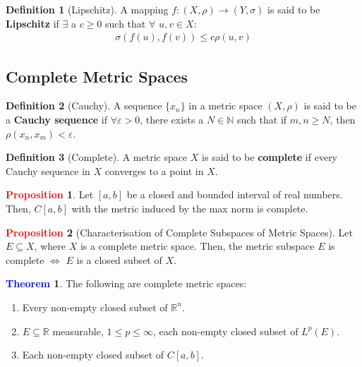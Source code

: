 \documentclass[11pt]{article}
\theoremstyle{definition}
\theoremstyle{definition}
\newcommand{\R}[0]{\mathbb{R}}
\newtheorem{theorem}{\textcolor{blue}{Theorem}}
\theoremstyle{definition}
\newtheorem{definition}{\textcolor{OliveGreen}{Definition}}
\newtheorem{prop}{\textcolor{red}{Proposition}}
\theoremstyle{remark}
\begin{document}
\begin{definition}[Lipschitz] 
	A mapping $f: (X, \rho) \rightarrow (Y, \sigma)$ is said to be \textbf{Lipschitz} if $\exists$ a $c \geq 0$ such that $\forall$ $u, v \in X$: 
	\begin{align*}
		\sigma(f (u), f(v) ) \leq c \rho(u,v) 	
	\end{align*}
\end{definition}

\subsection{Complete Metric Spaces} 

\begin{definition}[Cauchy] A sequence $\{ x_n \}$ in a metric space $(X, \rho)$ is said to be a \textbf{Cauchy sequence} if $\forall \varepsilon > 0$, there exists a $N \in \mathbb{N}$ such that if $m, n \geq N$, then $\rho(x_n, x_m) < \varepsilon$. 
\end{definition}

\begin{definition}[Complete]
	A metric space $X$ is said to be \textbf{complete} if every Cauchy sequence in $X$ converges to a point in $X$. 
\end{definition}

\begin{prop}
	Let $[a,b]$ be a closed and bounded interval of real numbers. Then, $C[a,b]$ with the metric induced by the max norm is complete. 
\end{prop}

\begin{prop}[Characterisation of Complete Subspaces of Metric Spaces]
	Let $E \subseteq X$, where $X$ is a complete metric space. Then, the metric subspace $E$ is complete $\iff$ $E$ is a closed subset of $X$. 
\end{prop}

\begin{theorem}
	The following are complete metric spaces: 
	\begin{enumerate}[noitemsep]
		\item Every non-empty closed subset of $\R^n$. 
		\item $E \subseteq \R$ measurable, $1 \leq p \leq \infty$, each non-empty closed subset of $L^p(E)$. 
		\item Each non-empty closed subset of $C[a,b]$. 
	\end{enumerate}
\end{theorem}
\end{document}
